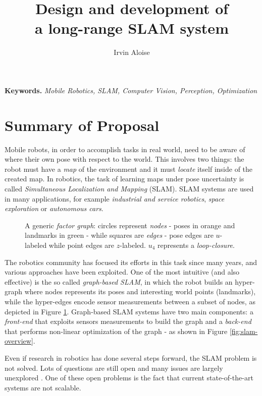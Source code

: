 \documentclass[10pt,a4paper, notitlepage]{report}
\title{Design and development of \\ a long-range SLAM system}
\author{Irvin Aloise}
\begin{document}
\maketitle


\textbf{Keywords.} \textit{Mobile Robotics, SLAM, Computer Vision, Perception, Optimization}


\section*{Summary of Proposal}
Mobile robots, in order to accomplish tasks in real world, need to be aware of where their own pose with respect to the world. This involves two things: the robot must have a \textit{map} of the environment and it must \textit{locate} itself inside of the created map. In robotics, the task of learning maps under pose uncertainty is called \textit{Simultaneous Localization and Mapping} (SLAM). SLAM systems are used in many applications, for example \textit{industrial and service robotics}, \textit{space exploration} or \textit{autonomous cars}. 

\begin{figure}[h]
    \centering
    \resizebox{0.8\textwidth}{!}{}
    \caption{A generic \textit{factor graph}: circles represent \textit{nodes} - poses in orange and landmarks in green -  while squares are \textit{edges} - pose edges are $u$-labeled while point edges are $z$-labeled. $u_4$ represents a \textit{loop-closure}.}
    \label{fig:graph}
\end{figure}

The robotics community has focused its efforts in this task since many years, and various approaches have been exploited. One of the most intuitive (and also effective) is the so called \textit{graph-based SLAM}\cite{lu1997globally}, in which the robot builds an hyper-graph where nodes represents its poses and interesting world points (landmarks), while the hyper-edges encode sensor measurements between a subset of nodes, as depicted in Figure \ref{fig:graph}. Graph-based SLAM systems have two main components: a \textit{front-end} that exploits sensors measurements to build the graph and a \textit{back-end} that performs non-linear optimization of the graph - as shown in Figure \ref{fig:slam-overview}. 

Even if research in robotics has done several steps forward, the SLAM problem is not solved. Lots of questions are still open and many issues are largely unexplored \cite{carlone2016slam-survey}. One of these open problems is the fact that current state-of-the-art systems are not scalable. 
\end{document}
